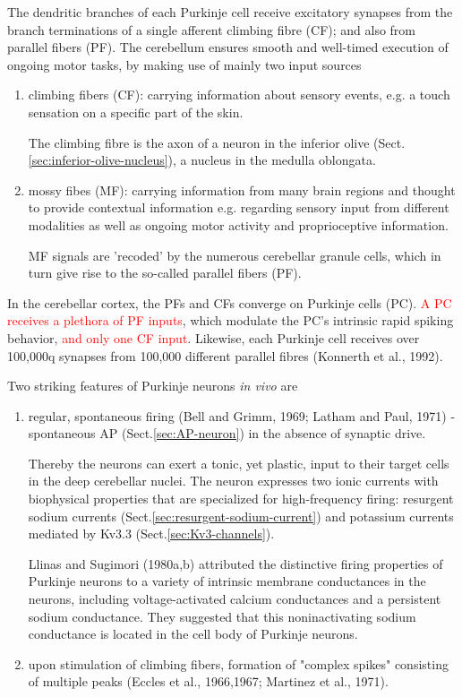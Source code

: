 The dendritic branches of each Purkinje cell receive excitatory synapses from
the branch terminations of a single afferent climbing fibre (CF); and also from
parallel fibers (PF).  The cerebellum ensures smooth and well-timed execution of
ongoing motor tasks, by making use of mainly two input sources
\begin{enumerate}
  \item climbing fibers (CF): carrying information about sensory events,
e.g. a touch sensation on a specific part of the skin.
  
  
  The climbing fibre is the axon of a neuron in the
  inferior olive (Sect.\ref{sec:inferior-olive-nucleus}), a nucleus in the medulla oblongata.

  
  \item mossy fibes (MF):  carrying information from many
  brain regions and thought to provide contextual information e.g.
regarding sensory input from different modalities as well as ongoing motor
activity and proprioceptive information.

MF signals are 'recoded' by the numerous cerebellar granule cells, which in
turn give rise to the so-called parallel fibers (PF).

\end{enumerate}
In the cerebellar cortex, the PFs and CFs converge on Purkinje cells (PC).
\textcolor{red}{A PC receives a plethora of PF inputs}, which modulate the PC's
intrinsic rapid spiking behavior, \textcolor{red}{and only one CF input}.
Likewise, each Purkinje cell receives over 100,000q synapses from 100,000
different parallel fibres (Konnerth et al., 1992).


Two striking features of Purkinje neurons {\it in vivo} are 
\begin{enumerate}
  \item regular, spontaneous firing (Bell and Grimm, 1969; Latham and Paul,
  1971) - spontaneous AP (Sect.\ref{sec:AP-neuron}) in the
absence of synaptic drive.

Thereby the neurons can exert a tonic, yet plastic, input to their target cells
in the deep cerebellar nuclei. The neuron expresses two ionic currents with
biophysical properties that are specialized for high-frequency firing: resurgent
sodium currents (Sect.\ref{sec:resurgent-sodium-current}) and potassium currents
mediated by Kv3.3 (Sect.\ref{sec:Kv3-channels}).

Llinas and Sugimori (1980a,b) attributed the distinctive firing properties of
Purkinje neurons to a variety of intrinsic membrane conductances in the neurons,
including voltage-activated calcium conductances and a persistent sodium
conductance. They suggested that this noninactivating sodium conductance is
located in the cell body of Purkinje neurons.

  \item upon stimulation of climbing fibers, formation of "complex spikes"
  consisting of multiple peaks (Eccles et al., 1966,1967; Martinez et al., 1971).
  
\end{enumerate}




